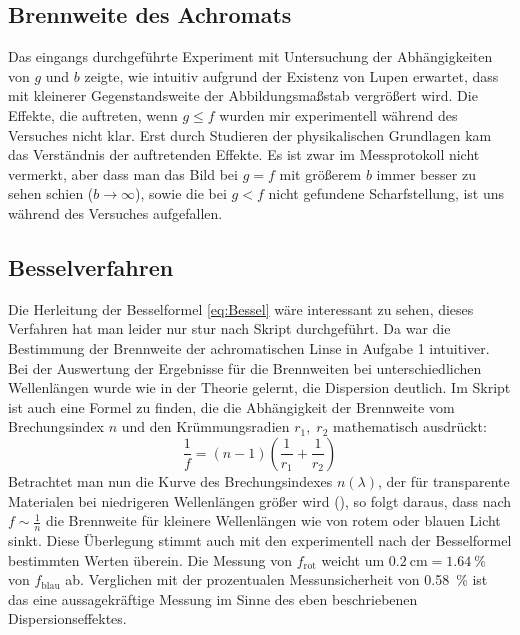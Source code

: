 \subsection{Brennweite des Achromats}
Das eingangs durchgeführte Experiment mit Untersuchung der Abhängigkeiten von \(g\) und \(b\) zeigte, wie intuitiv aufgrund der Existenz von Lupen erwartet, dass mit kleinerer Gegenstandsweite der Abbildungsmaßstab vergrößert wird. Die Effekte, die auftreten, wenn \(g\leq f\) wurden mir experimentell während des Versuches nicht klar. Erst durch Studieren der physikalischen Grundlagen kam das Verständnis der auftretenden Effekte. Es ist zwar im Messprotokoll nicht vermerkt, aber dass man das Bild bei \(g=f\) mit größerem \(b\) immer besser zu sehen schien (\(b\rightarrow \infty\)), sowie die bei \(g<f\) nicht gefundene Scharfstellung, ist uns während des Versuches aufgefallen.

\subsection{Besselverfahren}
Die Herleitung der Besselformel \cref{eq:Bessel} wäre interessant zu sehen, dieses Verfahren hat man leider nur stur nach Skript durchgeführt. Da war die Bestimmung der Brennweite der achromatischen Linse in Aufgabe 1 intuitiver. Bei der Auswertung der Ergebnisse für die Brennweiten bei unterschiedlichen Wellenlängen wurde wie in der Theorie gelernt, die Dispersion deutlich. Im Skript\autocite{Skript_1} ist auch eine Formel zu finden, die die Abhängigkeit der Brennweite vom Brechungsindex \(n\) und den Krümmungsradien \(r_1,\;r_2\) mathematisch ausdrückt: 
\begin{equation}
    \frac{1}{f}=(n-1)\left(\frac{1}{r_1}+\frac{1}{r_2}\right)
    \label{N}
\end{equation}
Betrachtet man nun die Kurve des Brechungsindexes \(n(\lambda)\), der für transparente Materialen bei niedrigeren Wellenlängen größer wird (\autocite{Brechungsindex}), so folgt daraus, dass nach \(f\sim \frac{1}{n}\) die Brennweite für kleinere Wellenlängen wie von rotem oder blauen Licht sinkt. Diese Überlegung stimmt auch mit den experimentell nach der Besselformel bestimmten Werten überein. Die Messung von \(f_{\text{rot}}\) weicht um \(\qty{+0,2}{\cm}=\qty{+1,64}{\%}\) von \(f_{\text{blau}}\) ab. Verglichen mit der prozentualen Messunsicherheit von \qty{0,58}{\%} ist das eine aussagekräftige Messung im Sinne des eben beschriebenen Dispersionseffektes.  

